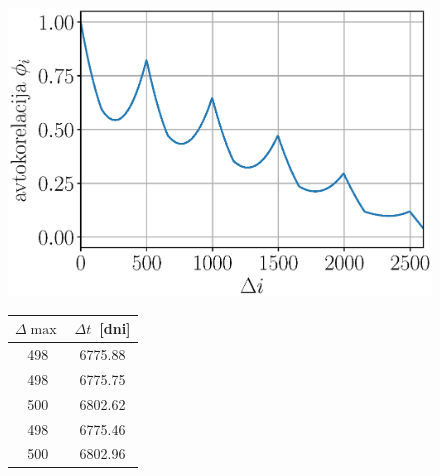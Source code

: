 \documentclass[a4paper,12pt]{article}
\begin{document}
\begin{figure}[h]
    \centering
    \begin{minipage}[t]{.65\textwidth}\vspace{0pt}%
        \centering
        \includegraphics[scale=0.6]{slikep/nodal-angle-acorr.eps}
        \label{fig:nodal-acorr}
    \end{minipage}%
    \qquad
    \begin{minipage}[t]{.28\textwidth}\vspace{4em}%
        \begin{center}
            \begin{tabular}{c c}
                \toprule
                $\Delta \max$ & $\Delta t$\ [dni] \\
                \midrule[0.03em]
                498 & 6775.88 \\
                498 & 6775.75 \\
                500 & 6802.62\\
                498 & 6775.46 \\
                500 & 6802.96 \\
                \bottomrule
            \end{tabular}
            \vspace{2.76em}
        \end{center}
    \end{minipage}
\end{figure}
\end{document}
